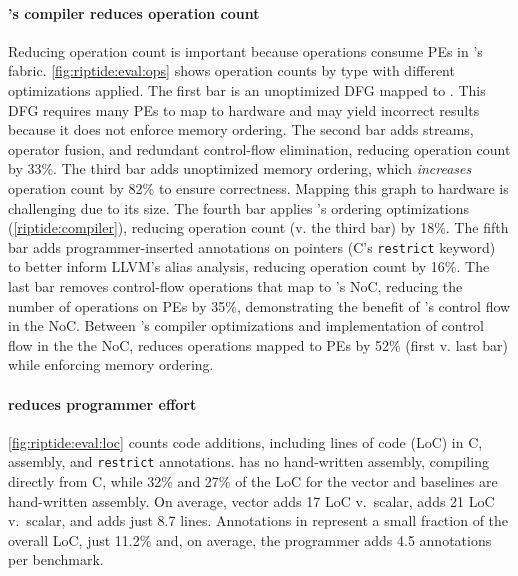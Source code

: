 \paragraph{\riptide's compiler reduces operation count} Reducing operation count
is important because operations consume PEs in \riptide's fabric.
%
\autoref{fig:riptide:eval:ops} shows operation counts by type with different optimizations applied.
% 
The first bar is an unoptimized DFG mapped to \riptide.
% 
This DFG requires many PEs to map to hardware and may yield incorrect
results because it does not enforce memory ordering.
% 
The second bar adds streams, operator fusion, and redundant control-flow
elimination, reducing operation count by 33\%.
% 
The third bar adds unoptimized memory ordering, which {\em increases} operation count by 82\% to ensure correctness.
% 
Mapping this graph to hardware is challenging due to its size.
% 
The fourth bar applies \riptide's ordering optimizations (\autoref{riptide:compiler}), reducing operation count (v. the third bar) by 18\%.
% 
The fifth bar adds programmer-inserted annotations on pointers (C's {\tt restrict} keyword)
to better inform LLVM's alias analysis, reducing operation count by 16\%.
% 
% 
The last bar removes control-flow operations that map to \riptide's NoC, reducing
the number of operations on PEs by 35\%, demonstrating the benefit of
\riptide's control flow in the NoC.
% 
Between \riptide's compiler optimizations and implementation of control flow in the the NoC, \riptide reduces operations mapped to PEs by 52\% (first v. last bar) while enforcing memory ordering.
% 
\figRipTideLoCResults

\paragraph{\riptide reduces programmer effort}
\autoref{fig:riptide:eval:loc} counts code additions, including lines of code (LoC) in C, assembly, and {\tt restrict} annotations.  
%
% 
\riptide has no hand-written assembly, compiling directly from C, while  32\% and
27\% of the LoC for the vector and \snafu baselines are hand-written assembly.
% 
On average, vector adds 17 LoC v.\ scalar, \snafu adds 21 LoC v.\ scalar, and
\riptide adds just 8.7 lines.
% 
Annotations in \riptide represent a small fraction of the overall LoC, just 11.2\%
and, on average, the programmer adds 4.5 annotations per benchmark.


